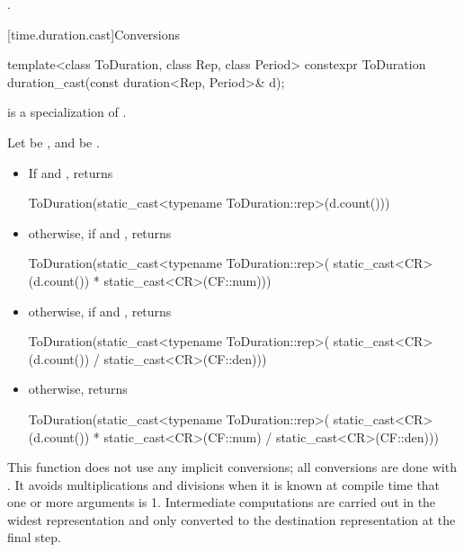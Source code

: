\begin{itemdescr}
\pnum
\returns
{}.
\end{itemdescr}

[time.duration.cast]{Conversions}

%
%
\begin{itemdecl}
template<class ToDuration, class Rep, class Period>
  constexpr ToDuration duration_cast(const duration<Rep, Period>& d);
\end{itemdecl}

\begin{itemdescr}
\pnum
\constraints
{} is a specialization of .

\pnum
\returns
Let  be , and  be .
\begin{itemize}
\item If  and , returns
\begin{codeblock}
ToDuration(static_cast<typename ToDuration::rep>(d.count()))
\end{codeblock}

\item otherwise, if  and , returns
\begin{codeblock}
ToDuration(static_cast<typename ToDuration::rep>(
  static_cast<CR>(d.count()) * static_cast<CR>(CF::num)))
\end{codeblock}

\item otherwise, if  and , returns
\begin{codeblock}
ToDuration(static_cast<typename ToDuration::rep>(
  static_cast<CR>(d.count()) / static_cast<CR>(CF::den)))
\end{codeblock}

\item otherwise, returns
\begin{codeblock}
ToDuration(static_cast<typename ToDuration::rep>(
  static_cast<CR>(d.count()) * static_cast<CR>(CF::num) / static_cast<CR>(CF::den)))
\end{codeblock}
\end{itemize}

\pnum
\begin{note}
This function does not use any implicit conversions; all conversions
are done with . It avoids multiplications and divisions when
it is known at compile time that one or more arguments is 1. Intermediate
computations are carried out in the widest representation and only converted to
the destination representation at the final step.
\end{note}
\end{itemdescr}

